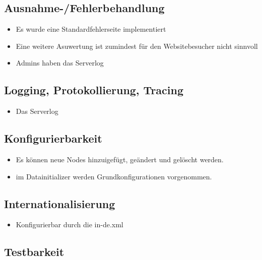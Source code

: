 \documentclass[a4paper]{article}
\begin{document}
\subsection{Ausnahme-/Fehlerbehandlung}

\begin{itemize}
	\item Es wurde eine Standardfehlerseite implementiert
	\item Eine weitere Asuwertung ist zumindest für den Websitebesucher nicht sinnvoll
	\item Admins haben das Serverlog
\end{itemize}

\subsection{Logging, Protokollierung, Tracing}

\begin{itemize}
	\item Das Serverlog
\end{itemize}

\subsection{Konfigurierbarkeit}

\begin{itemize}
	\item Es können neue Nodes hinzuigefügt, geändert und gelöscht werden.
	\item im Datainitializer werden Grundkonfigurationen vorgenommen.
\end{itemize}

\subsection{Internationalisierung}

\begin{itemize}
	\item Konfigurierbar durch die in-de.xml
\end{itemize}

\subsection{Testbarkeit}
\end{document}
